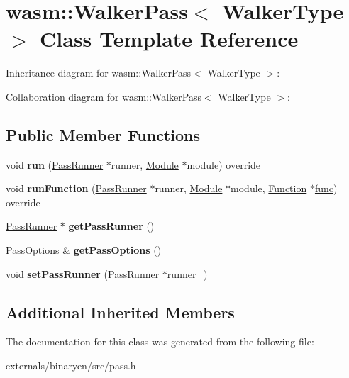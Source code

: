 \hypertarget{classwasm_1_1_walker_pass}{}\section{wasm\+:\+:Walker\+Pass$<$ Walker\+Type $>$ Class Template Reference}
\label{classwasm_1_1_walker_pass}


Inheritance diagram for wasm\+:\+:Walker\+Pass$<$ Walker\+Type $>$\+:


Collaboration diagram for wasm\+:\+:Walker\+Pass$<$ Walker\+Type $>$\+:
\subsection*{Public Member Functions}
\begin{DoxyCompactItemize}
\item 
\mbox{\label{classwasm_1_1_walker_pass_af331ceef12b3180234f05481bcfcc153}} 
void {\bfseries run} (\mbox{\hyperlink{structwasm_1_1_pass_runner}{Pass\+Runner}} $\ast$runner, \mbox{\hyperlink{classwasm_1_1_module}{Module}} $\ast$module) override
\item 
\mbox{\label{classwasm_1_1_walker_pass_a107dd6c5673e7cad718f9178dc07e788}} 
void {\bfseries run\+Function} (\mbox{\hyperlink{structwasm_1_1_pass_runner}{Pass\+Runner}} $\ast$runner, \mbox{\hyperlink{classwasm_1_1_module}{Module}} $\ast$module, \mbox{\hyperlink{classwasm_1_1_function}{Function}} $\ast$\mbox{\hyperlink{structfunc}{func}}) override
\item 
\mbox{\label{classwasm_1_1_walker_pass_a9ede09c7cef13282b40f1067624aa87f}} 
\mbox{\hyperlink{structwasm_1_1_pass_runner}{Pass\+Runner}} $\ast$ {\bfseries get\+Pass\+Runner} ()
\item 
\mbox{\label{classwasm_1_1_walker_pass_a0e056c82f8b7e5674ff55275b52f801e}} 
\mbox{\hyperlink{structwasm_1_1_pass_options}{Pass\+Options}} \& {\bfseries get\+Pass\+Options} ()
\item 
\mbox{\label{classwasm_1_1_walker_pass_ac9e077d95fe2e9bfc988c1dba2a33c67}} 
void {\bfseries set\+Pass\+Runner} (\mbox{\hyperlink{structwasm_1_1_pass_runner}{Pass\+Runner}} $\ast$runner\+\_\+)
\end{DoxyCompactItemize}
\subsection*{Additional Inherited Members}


The documentation for this class was generated from the following file\+:\begin{DoxyCompactItemize}
\item 
externals/binaryen/src/pass.\+h\end{DoxyCompactItemize}
